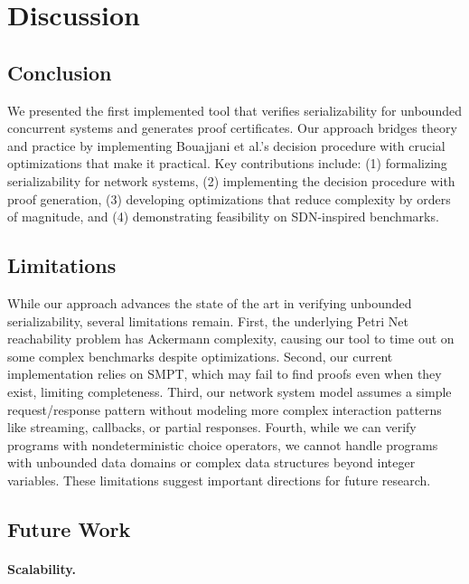 \section{Discussion}
\label{sec:discussion}

\subsection{Conclusion}

We presented the first implemented tool that verifies serializability for unbounded concurrent systems and generates proof certificates.
Our approach bridges theory and practice by implementing Bouajjani et al.'s decision procedure with crucial optimizations that make it practical.
%
Key contributions include: (1) formalizing serializability for network systems, (2) implementing the decision procedure with proof generation, (3) developing optimizations that reduce complexity by orders of magnitude, and (4) demonstrating feasibility on SDN-inspired benchmarks.

%

\subsection{Limitations}

While our approach advances the state of the art in verifying unbounded serializability, several limitations remain.
First, the underlying Petri Net reachability problem has Ackermann complexity, causing our tool to time out on some complex benchmarks despite optimizations.
Second, our current implementation relies on SMPT, which may fail to find proofs even when they exist, limiting completeness.
Third, our network system model assumes a simple request/response pattern without modeling more complex interaction patterns like streaming, callbacks, or partial responses.
Fourth, while we can verify programs with nondeterministic choice operators, we cannot handle programs with unbounded data domains or complex data structures beyond integer variables.
These limitations suggest important directions for future research.

\subsection{Future Work}

\paragraph{Scalability.}


